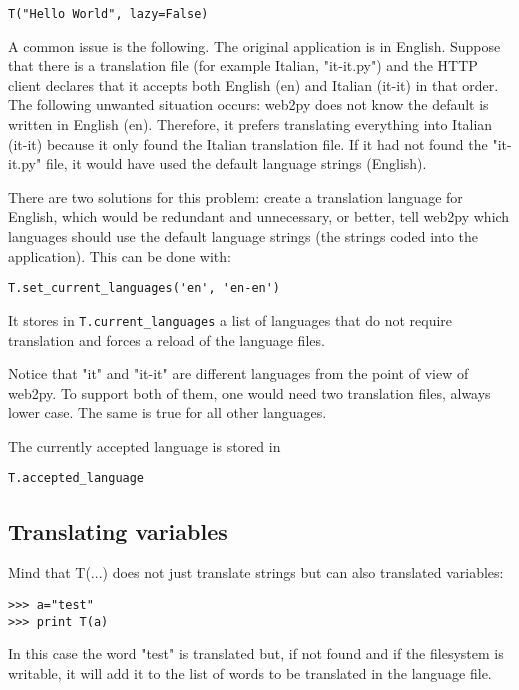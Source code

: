 \documentclass[justified,sixbynine,notoc]{tufte-book}
\def\ft{\small\tt}
\begin{document}
\begin{fullwidth}
\begin{lstlisting}
T("Hello World", lazy=False)
\end{lstlisting}

A common issue is the following. The original application is in English. Suppose that there is a translation file (for example Italian, "it-it.py") and the HTTP client declares that it accepts both English (en) and Italian (it-it) in that order. The following unwanted situation occurs: web2py does not know the default is written in English (en). Therefore, it prefers translating everything into Italian (it-it) because it only found the Italian translation file. If it had not found the "it-it.py" file, it would have used the default language strings (English).

There are two solutions for this problem: create a translation language for English, which would be redundant and unnecessary, or better, tell web2py which languages should use the default language strings (the strings coded into the application). This can be done with:
\begin{lstlisting}
T.set_current_languages('en', 'en-en')
\end{lstlisting}

It stores in  {\ft T.current\_languages} a list of languages that do not require translation and forces a reload of the language files.

Notice that "it" and "it-it" are different languages from the point of view of web2py. To support both of them, one would need two translation files, always lower case. The same is true for all other languages.

The currently accepted language is stored in
\begin{lstlisting}
T.accepted_language
\end{lstlisting}

\goodbreak\subsection{Translating variables}

Mind that T(...) does not just translate strings but can also translated variables:
\begin{lstlisting}
>>> a="test"
>>> print T(a)
\end{lstlisting}

In this case the word "test" is translated but, if not found and if the filesystem is writable, it will add it to the list of words to be translated in the language file.


\end{fullwidth}
\end{document}
